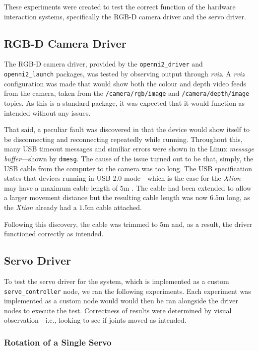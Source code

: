 These experiments were created to test the correct function of the hardware interaction systems, specifically the RGB-D camera driver and the servo driver.

\subsection{RGB-D Camera Driver}

The RGB-D camera driver, provided by the \texttt{openni2\_driver} and \texttt{openni2\_launch} packages, was tested by observing output through \emph{rviz}. A \emph{rviz} configuration was made that would show both the colour and depth video feeds from the camera, taken from the \texttt{/camera/rgb/image} and \texttt{/camera/depth/image} topics. As this is a standard package, it was expected that it would function as intended without any issues.

That said, a peculiar fault was discovered in that the device would show itself to be disconnecting and reconnecting repeatedly while running. Throughout this, many USB timeout messages and similiar errors were shown in the Linux \emph{message buffer}---shown by \texttt{dmesg}. The cause of the issue turned out to be that, simply, the USB cable from the computer to the camera was too long. The USB specification states that devices running in USB 2.0 mode---which is the case for the \emph{Xtion}---may have a maximum cable length of $5$m \cite{usb_spec}. The cable had been extended to allow a larger movement distance but the resulting cable length was now $6.5$m long, as the \emph{Xtion} already had a $1.5$m cable attached.

Following this discovery, the cable was trimmed to $5$m and, as a result, the driver functioned correctly as intended.

\subsection{Servo Driver}

To test the servo driver for the system, which is implemented as a custom \texttt{servo\_controller} node, we ran the following experiments. Each experiment was implemented as a custom node would would then be ran alongside the driver nodes to execute the test. Correctness of results were determined by visual observation---i.e., looking to see if joints moved as intended. 

\subsubsection{Rotation of a Single Servo}

